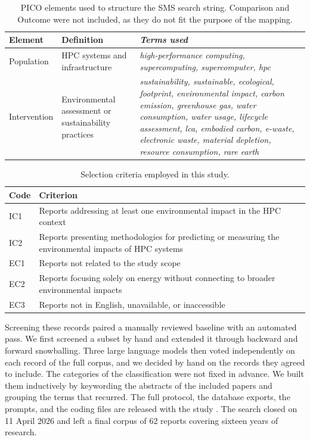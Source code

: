 \begin{table}
\centering
\small
\begin{tabularx}{\textwidth}{p{}p{}>{\itshape}X}
\toprule
\textbf{Element} & \textbf{Definition} & \normalfont\textbf{Terms used} \\
\midrule
Population & HPC systems and infrastructure & high-performance computing, supercomputing, supercomputer, hpc \\
Intervention & Environmental assessment or sustainability practices & sustainability, sustainable, ecological, footprint, environmental impact, carbon emission, greenhouse gas, water consumption, water usage, lifecycle assessment, lca, embodied carbon, e-waste, electronic waste, material depletion, resource consumption, rare earth \\
\bottomrule
\end{tabularx}
\caption{PICO elements used to structure the SMS search string. Comparison and Outcome were not included, as they do not fit the purpose of the mapping.}
\label{tab:pico}
\end{table}

\begin{table}
\centering
\small
\begin{tabularx}{\textwidth}{>{\raggedright\arraybackslash}p{}X}
\toprule
\textbf{Code} & \textbf{Criterion} \\
\midrule
IC1 & Reports addressing at least one environmental impact in the HPC context \\
IC2 & Reports presenting methodologies for predicting or measuring the environmental impacts of HPC systems \\
\midrule
EC1 & Reports not related to the study scope \\
EC2 & Reports focusing solely on energy without connecting to broader environmental impacts \\
EC3 & Reports not in English, unavailable, or inaccessible \\
\bottomrule
\end{tabularx}
\caption{Selection criteria employed in this study.}
\label{tab:criteria}
\end{table}

Screening these records paired a manually reviewed baseline with an automated pass. We first screened a subset by hand and extended it through backward and forward snowballing. Three large language models then voted independently on each record of the full corpus, and we decided by hand on the records they agreed to include. The categories of the classification were not fixed in advance. We built them inductively by keywording the abstracts of the included papers and grouping the terms that recurred. The full protocol, the database exports, the prompts, and the coding files are released with the study \parencite{rosa2026Environmental}. The search closed on 11 April 2026 and left a final corpus of 62 reports covering sixteen years of research.

